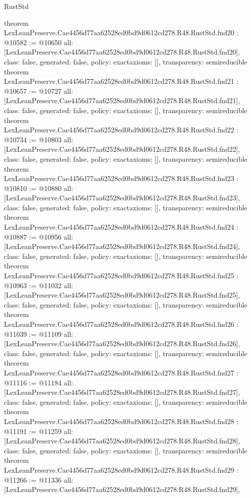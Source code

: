 \begin{lexlean}{RustStd}
\begin{coremodule}
{}
theorem LexLeanPreserve.Cae4456d77aa62528ed0bd9d0612cd278.R48.RustStd.fnd20 : @10582 := @10650 {
  all: [LexLeanPreserve.Cae4456d77aa62528ed0bd9d0612cd278.R48.RustStd.fnd20],
  class: false,
  generated: false,
  policy: exact{axioms: []},
  transparency: semireducible
}
theorem LexLeanPreserve.Cae4456d77aa62528ed0bd9d0612cd278.R48.RustStd.fnd21 : @10657 := @10727 {
  all: [LexLeanPreserve.Cae4456d77aa62528ed0bd9d0612cd278.R48.RustStd.fnd21],
  class: false,
  generated: false,
  policy: exact{axioms: []},
  transparency: semireducible
}
theorem LexLeanPreserve.Cae4456d77aa62528ed0bd9d0612cd278.R48.RustStd.fnd22 : @10734 := @10803 {
  all: [LexLeanPreserve.Cae4456d77aa62528ed0bd9d0612cd278.R48.RustStd.fnd22],
  class: false,
  generated: false,
  policy: exact{axioms: []},
  transparency: semireducible
}
theorem LexLeanPreserve.Cae4456d77aa62528ed0bd9d0612cd278.R48.RustStd.fnd23 : @10810 := @10880 {
  all: [LexLeanPreserve.Cae4456d77aa62528ed0bd9d0612cd278.R48.RustStd.fnd23],
  class: false,
  generated: false,
  policy: exact{axioms: []},
  transparency: semireducible
}
theorem LexLeanPreserve.Cae4456d77aa62528ed0bd9d0612cd278.R48.RustStd.fnd24 : @10887 := @10956 {
  all: [LexLeanPreserve.Cae4456d77aa62528ed0bd9d0612cd278.R48.RustStd.fnd24],
  class: false,
  generated: false,
  policy: exact{axioms: []},
  transparency: semireducible
}
theorem LexLeanPreserve.Cae4456d77aa62528ed0bd9d0612cd278.R48.RustStd.fnd25 : @10963 := @11032 {
  all: [LexLeanPreserve.Cae4456d77aa62528ed0bd9d0612cd278.R48.RustStd.fnd25],
  class: false,
  generated: false,
  policy: exact{axioms: []},
  transparency: semireducible
}
theorem LexLeanPreserve.Cae4456d77aa62528ed0bd9d0612cd278.R48.RustStd.fnd26 : @11039 := @11109 {
  all: [LexLeanPreserve.Cae4456d77aa62528ed0bd9d0612cd278.R48.RustStd.fnd26],
  class: false,
  generated: false,
  policy: exact{axioms: []},
  transparency: semireducible
}
theorem LexLeanPreserve.Cae4456d77aa62528ed0bd9d0612cd278.R48.RustStd.fnd27 : @11116 := @11184 {
  all: [LexLeanPreserve.Cae4456d77aa62528ed0bd9d0612cd278.R48.RustStd.fnd27],
  class: false,
  generated: false,
  policy: exact{axioms: []},
  transparency: semireducible
}
theorem LexLeanPreserve.Cae4456d77aa62528ed0bd9d0612cd278.R48.RustStd.fnd28 : @11191 := @11259 {
  all: [LexLeanPreserve.Cae4456d77aa62528ed0bd9d0612cd278.R48.RustStd.fnd28],
  class: false,
  generated: false,
  policy: exact{axioms: []},
  transparency: semireducible
}
theorem LexLeanPreserve.Cae4456d77aa62528ed0bd9d0612cd278.R48.RustStd.fnd29 : @11266 := @11336 {
  all: [LexLeanPreserve.Cae4456d77aa62528ed0bd9d0612cd278.R48.RustStd.fnd29],
}
\end{coremodule}
\end{lexlean}

